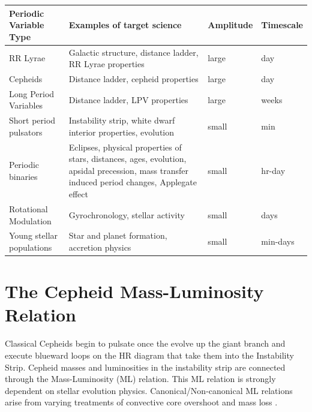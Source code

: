 
\begin{center}
\begin{tabular}{| l | p{8cm} |l | l |}
\hline Periodic Variable Type & Examples of target science & Amplitude & Timescale\\
\hline
RR Lyrae & Galactic structure, distance ladder, RR Lyrae properties&  large &  day \\
Cepheids & Distance ladder, cepheid properties&  large &  day \\
Long Period Variables & Distance ladder, LPV properties & large  &  weeks \\
Short period pulsators & Instability strip, white dwarf interior properties, evolution&  small & min  \\
Periodic binaries & Eclipses, physical properties of stars, distances, ages, evolution, apsidal precession, mass transfer induced period changes, Applegate effect &  small &  hr-day \\
Rotational Modulation & Gyrochronology, stellar activity& small  &  days \\
Young stellar populations & Star and planet formation, accretion physics & small  &  min-days \\
 \hline \end{tabular}
 \end{center}
 
 \section{The Cepheid Mass-Luminosity Relation}

Classical Cepheids begin to pulsate once the evolve up the giant branch and
execute blueward loops on the HR diagram that take them into the Instability
Strip. Cepheid masses and luminosities in the instability strip are connected
through the Mass-Luminosity (ML) relation.  This ML relation is strongly
dependent on stellar evolution physics. Canonical/Non-canonical ML relations
arise from varying treatments of convective core overshoot and mass loss
\citep{1992A&A...258..397B,2000ApJ...529..293B,2013ApJ...768L...6M}.

